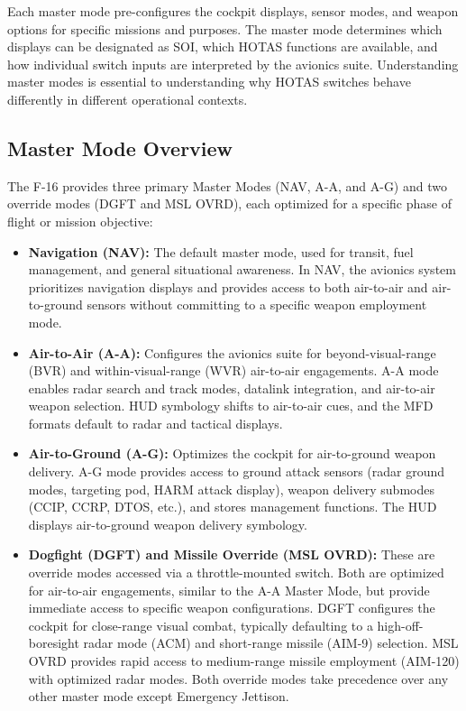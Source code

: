 \documentclass[11pt, a4paper, twoside]{report}
\begin{document}
Each master mode pre-configures the cockpit displays, sensor modes, and weapon options for specific missions and purposes. The master mode determines which displays can be designated as SOI, which HOTAS functions are available, and how individual switch inputs are interpreted by the avionics suite. Understanding master modes is essential to understanding why HOTAS switches behave differently in different operational contexts.


\subsection{Master Mode Overview}
\label{sec:C2-S2-S1}

The F-16 provides three primary Master Modes (NAV, A-A, and A-G) and two override modes (DGFT and MSL OVRD), each optimized for a specific phase of flight or mission objective:

\begin{itemize}
	\item \textbf{Navigation (NAV):} The default master mode, used for transit, fuel management, and general situational awareness. In NAV, the avionics system prioritizes navigation displays and provides access to both air-to-air and air-to-ground sensors without committing to a specific weapon employment mode.
	
	\item \textbf{Air-to-Air (A-A):} Configures the avionics suite for beyond-visual-range (BVR) and within-visual-range (WVR) air-to-air engagements. A-A mode enables radar search and track modes, datalink integration, and air-to-air weapon selection. HUD symbology shifts to air-to-air cues, and the MFD formats default to radar and tactical displays.
	
	\item \textbf{Air-to-Ground (A-G):} Optimizes the cockpit for air-to-ground weapon delivery. A-G mode provides access to ground attack sensors (radar ground modes, targeting pod, HARM attack display), weapon delivery submodes (CCIP, CCRP, DTOS, etc.), and stores management functions. The HUD displays air-to-ground weapon delivery symbology.
	
	\item \textbf{Dogfight (DGFT) and Missile Override (MSL OVRD):} These are override 	modes accessed via a throttle-mounted switch. Both are optimized for air-to-air engagements, similar to the A-A Master Mode, but provide immediate access to specific weapon configurations. DGFT configures the cockpit for close-range visual combat, typically defaulting to a high-off-boresight radar mode (ACM) and short-range missile (AIM-9) selection. MSL OVRD provides rapid access to medium-range missile employment (AIM-120) with optimized radar modes. Both override modes take precedence over any other master mode except Emergency Jettison.
\end{itemize}
\end{document}
